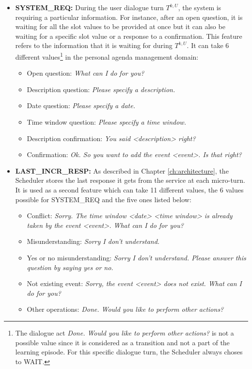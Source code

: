         \begin{itemize}
        	\item \textbf{SYSTEM\_REQ:} During the user dialogue turn $T^{k,U}$, the system is requiring a particular information. For instance, after an open question, it is waiting for all the slot values to be provided at once but it can also be waiting for a specific slot value or a response to a confirmation. This feature refers to the information that it is waiting for during $T^{k,U}$. It can take 6 different values\footnote{The dialogue act \textit{Done. Would you like to perform other actions?} is not a possible value since it is considered as a transition and not a part of the learning episode. For this specific dialogue turn, the Scheduler always choses to WAIT.} in the personal agenda management domain:
					
						\begin{itemize}
							\item Open question: \textit{What can I do for you?}
							\item Description question: \textit{Please specify a description.}
							\item Date question: \textit{Please specify a date.}
							\item Time window question: \textit{Please specify a time window.}
							\item Description confirmation: \textit{You said <description> right?}
							\item Confirmation: \textit{Ok. So you want to add the event <event>. Is that right?}
						\end{itemize}
					
            \item \textbf{LAST\_INCR\_RESP:} As described in Chapter \ref{ch:architecture}, the Scheduler stores the last response it gets from the service at each micro-turn. It is used as a second feature which can take 11 different values, the 6 values possible for SYSTEM\_REQ and the five ones listed below:
						
						\begin{itemize}
							\item Conflict: \textit{Sorry. The time window <date> <time window> is already taken by the event <event>. What can I do for you?}
							\item Misunderstanding: \textit{Sorry I don't understand.}
							\item Yes or no misunderstanding: \textit{Sorry I don't understand. Please answer this question by saying yes or no.}
							\item Not existing event: \textit{Sorry, the event <event> does not exist. What can I do for you?}
							\item Other operations: \textit{Done. Would you like to perform other actions?}
						\end{itemize}
						

\end{itemize}
